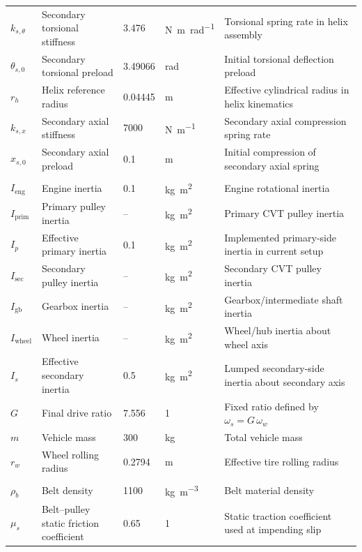 \documentclass[11pt]{article}
\numberwithin{equation}{section}
\begin{document}
\begin{center}
\begin{longtable}{@{}p{}p{}p{}p{}p{}@{}}
$k_{s,\theta}$ & Secondary torsional stiffness & 3.476 & \si{\newton\meter\per\radian} & Torsional spring rate in helix assembly \\
$\theta_{s,0}$ & Secondary torsional preload & 3.49066 & \si{\radian} & Initial torsional deflection preload \\
$r_h$ & Helix reference radius & 0.04445 & \si{\meter} & Effective cylindrical radius in helix kinematics \\
$k_{s,x}$ & Secondary axial stiffness & 7000 & \si{\newton\per\meter} & Secondary axial compression spring rate \\
$x_{s,0}$ & Secondary axial preload & 0.1 & \si{\meter} & Initial compression of secondary axial spring \\
\addlinespace
\multicolumn{5}{@{}l}{\textbf{Inertia and drivetrain}} \\
$I_{\mathrm{eng}}$ & Engine inertia & 0.1 & \si{\kilogram\meter\squared} & Engine rotational inertia \\
$I_{\mathrm{prim}}$ & Primary pulley inertia & -- & \si{\kilogram\meter\squared} & Primary CVT pulley inertia \\
$I_p$ & Effective primary inertia & 0.1 & \si{\kilogram\meter\squared} & Implemented primary-side inertia in current setup \\
$I_{\mathrm{sec}}$ & Secondary pulley inertia & -- & \si{\kilogram\meter\squared} & Secondary CVT pulley inertia \\
$I_{\mathrm{gb}}$ & Gearbox inertia & -- & \si{\kilogram\meter\squared} & Gearbox/intermediate shaft inertia \\
$I_{\mathrm{wheel}}$ & Wheel inertia & -- & \si{\kilogram\meter\squared} & Wheel/hub inertia about wheel axis \\
$I_s$ & Effective secondary inertia & 0.5 & \si{\kilogram\meter\squared} & Lumped secondary-side inertia about secondary axis \\
$G$ & Final drive ratio & 7.556 & 1 & Fixed ratio defined by $\omega_s = G\,\omega_w$ \\
$m$ & Vehicle mass & 300 & \si{\kilogram} & Total vehicle mass \\
$r_w$ & Wheel rolling radius & 0.2794 & \si{\meter} & Effective tire rolling radius \\
\addlinespace
\multicolumn{5}{@{}l}{\textbf{Contact and environment}} \\
$\rho_b$ & Belt density & 1100 & \si{\kilogram\per\meter\cubed} & Belt material density \\
$\mu_s$ & Belt--pulley static friction coefficient & 0.65 & 1 & Static traction coefficient used at impending slip \\

\end{longtable}
\end{center}
\end{document}
